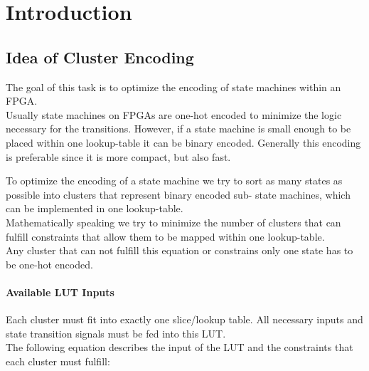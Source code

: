 \chapter{Introduction}
\label{cha:introduction}





\section{Idea of Cluster Encoding}
\label{sec:clusterSearch}

The goal of this task is to optimize the encoding of state machines within an FPGA.\\
Usually state machines on FPGAs are one-hot encoded to minimize the logic necessary for the transitions. However, if a state machine is small enough to be placed within one lookup-table it can be binary encoded. Generally this encoding is preferable since it is more compact, but also fast.

To optimize the encoding of a state machine we try to sort as many states as possible into clusters that represent binary encoded sub- state machines, which can be implemented in one lookup-table.\\
Mathematically speaking we try to minimize the number of clusters that can fulfill constraints that allow them to be mapped within one lookup-table.\\
Any cluster that can not fulfill this equation or constrains only one state has to be one-hot encoded.



\subsubsection{Available LUT Inputs}
\label{subsubsec:LUTInputs}
Each cluster must fit into exactly one slice/lookup table. All necessary inputs and state transition signals must be fed into this LUT. \\
The following equation describes the input of the LUT and the constraints that each cluster must fulfill:

